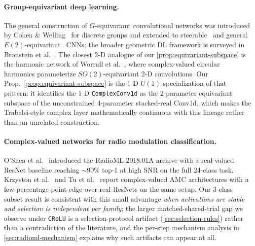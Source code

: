 \documentclass{article}
\providecommand{\Cref}[1]{\autoref{#1}}
\newcommand{\code}[1]{\texttt{#1}}
\begin{document}
\paragraph{Group-equivariant deep learning.}
The general construction of $G$-equivariant convolutional networks
was introduced by Cohen \& Welling~\cite{cohen2016group} for discrete
groups and extended to steerable~\cite{cohen2017steerable} and
general $E(2)$-equivariant~\cite{weiler2019general} CNNs; the broader
geometric DL framework is surveyed in Bronstein et
al.~\cite{bronstein2021geometric}. The closest 2-D analogue of our
\Cref{prop:equivariant-subspace} is the harmonic network of Worrall
et al.~\cite{worrall2017harmonic}, where complex-valued circular
harmonics parameterize $SO(2)$-equivariant 2-D convolutions. Our
Prop.~\ref{prop:equivariant-subspace} is the 1-D $U(1)$ specialization
of that pattern: it identifies the 1-D \code{ComplexConv1d} as the
$2$-parameter equivariant subspace of the unconstrained
$4$-parameter stacked-real Conv1d, which makes the Trabelsi-style
complex layer mathematically continuous with this lineage rather
than an unrelated construction.

\paragraph{Complex-valued networks for radio modulation classification.}
O'Shea et al.~\cite{oshea2018radioml} introduced the RadioML
2018.01A archive with a real-valued ResNet baseline reaching
$\sim$90\% top-1 at high SNR on the full 24-class task. Krzyston
et al.~\cite{krzyston2020complex} and Tu et al.~\cite{tu2020complex}
report complex-valued AMC architectures with a few-percentage-point
edge over real ResNets on the same setup. Our 3-class subset result
is consistent with this small advantage \emph{when activations are
stable and selection is independent per family}; the larger
matched-shared-trial gap we observe under \code{CReLU} is a
selection-protocol artifact (\Cref{sec:selection-rules}) rather than
a contradiction of the literature, and the per-step mechanism
analysis in \Cref{sec:radioml-mechanism} explains why such artifacts
can appear at all.
\end{document}
